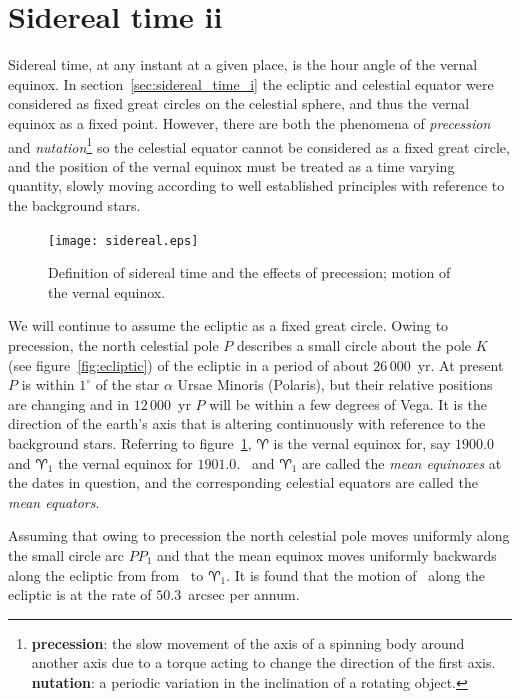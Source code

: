 \section{Sidereal time {\sc ii}}

Sidereal time, at any instant at a given place, is the hour angle of the vernal 
equinox. In section~\ref{sec:sidereal_time_i} the ecliptic and celestial equator were 
considered as fixed great circles on the celestial sphere, and thus the vernal
equinox as a fixed point. However, there are both the phenomena of {\it 
precession} and {\it nutation}\footnote{{\bf precession}: the slow movement of the axis of a spinning body around another axis due to a torque acting to change the direction of the first axis. {\bf nutation}: a periodic variation in the inclination of a rotating object.}  so the celestial equator cannot be considered 
as a fixed great circle, and the position of the vernal equinox must be treated as
a time varying quantity, slowly moving according to well established principles with
reference to the background stars.

\begin{figure}[h]
	\centering
	\texttt{[image: sidereal.eps]}
	\caption{Definition of sidereal time and the effects of precession; motion 
		of the vernal equinox. }
	\label{fig:sidereal}
\end{figure}

We will continue to assume the ecliptic as a fixed great circle. Owing to precession, 
the north celestial pole $P$ describes a small circle about the pole $K$ (see 
figure~\ref{fig:ecliptic}) of the ecliptic in a period of about $26\,000$~yr. At 
present $P$ is within $1^\circ$ of the star $\alpha$ Ursae Minoris (Polaris), but 
their relative positions are changing and in $12\,000$~yr  $P$ will be within a few
degrees of Vega. It is the direction of the earth's axis that is altering continuously 
with reference to the background stars. Referring to figure~\ref{fig:sidereal},
$\aries$ is the vernal equinox for, say $1900.0$ and $\aries_1$ the vernal equinox
for $1901.0$. \aries\ and $\aries_1$ are called the {\it mean equinoxes} at the dates
in question, and the corresponding celestial equators are called the 
{\it mean equators}. 

Assuming that owing to precession the north celestial pole moves uniformly along the 
small circle arc $PP_1$ and that the mean equinox moves uniformly backwards along the 
ecliptic from from \aries\  to $\aries_1$. It is found that the motion of \aries\  along
the ecliptic is at the rate of $50.3$~arcsec per annum.

